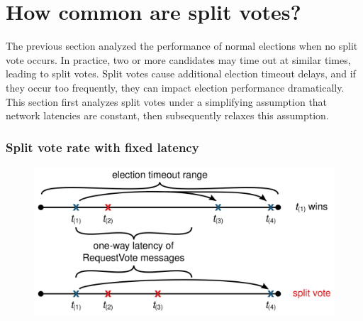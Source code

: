 \section{How common are split votes?}
\label{leaderelection:split:rate}

The previous section analyzed the performance of normal elections when
no split vote occurs. In practice, two or more candidates may time out
at similar times, leading to split votes.  Split votes cause additional
election timeout delays, and if they occur too frequently, they can
impact election performance dramatically. This section first analyzes
split votes under a simplifying assumption that network latencies are
constant, then subsequently relaxes this assumption.

\subsubsection{Split vote rate with fixed latency}

\begin{figure}
\centering
\includegraphics[scale=.5]{leaderelection/splitvotediagram}
\label{fig:leaderelection:theory:splitvotediagram}
\end{figure}

